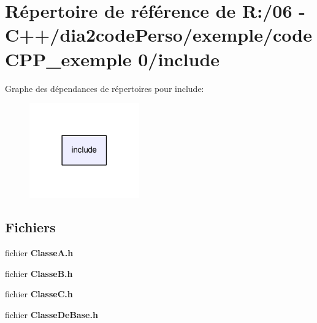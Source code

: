 \section{Répertoire de référence de R\+:/06 -\/ C++/dia2code\+Perso/exemple/code\+C\+P\+P\+\_\+exemple 0/include}
\label{dir_d44c64559bbebec7f509842c48db8b23}
Graphe des dépendances de répertoires pour include\+:
\nopagebreak
\begin{figure}[H]
\begin{center}
\leavevmode
\includegraphics[width=134pt]{dir_d44c64559bbebec7f509842c48db8b23_dep}
\end{center}
\end{figure}
\subsection*{Fichiers}
\begin{DoxyCompactItemize}
\item 
fichier {\bf Classe\+A.\+h}
\item 
fichier {\bf Classe\+B.\+h}
\item 
fichier {\bf Classe\+C.\+h}
\item 
fichier {\bf Classe\+De\+Base.\+h}
\end{DoxyCompactItemize}
